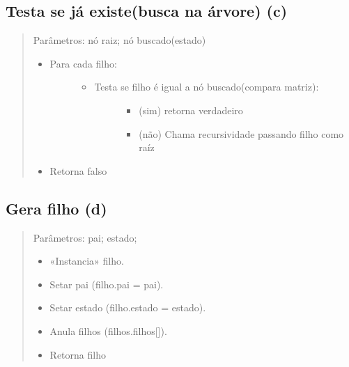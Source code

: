\documentclass[letterpaper,10pt,openany,oneside,portuges]{sphinxmanual}
\begin{document}
\subsection{Testa se já existe(busca na árvore) (c)}
\label{\detokenize{pseudo:testa-se-ja-existe-busca-na-arvore-c}}\begin{quote}

Parâmetros: nó raiz; nó buscado(estado)
\begin{itemize}
\item {} \begin{description}
\item[{Para cada filho:}] \leavevmode\begin{itemize}
\item {} \begin{description}
\item[{Testa se filho é igual a nó buscado(compara matriz):}] \leavevmode\begin{itemize}
\item {} 
(sim) retorna verdadeiro

\item {} 
(não) Chama recursividade passando filho como raíz

\end{itemize}

\end{description}

\end{itemize}

\end{description}

\item {} 
Retorna falso

\end{itemize}
\end{quote}


\subsection{Gera filho (d)}
\label{\detokenize{pseudo:gera-filho-d}}\begin{quote}

Parâmetros: pai; estado;
\begin{itemize}
\item {} 
«Instancia» filho.

\item {} 
Setar pai (filho.pai = pai).

\item {} 
Setar estado (filho.estado = estado).

\item {} 
Anula filhos (filhos.filhos{[}{]}).

\item {} 
Retorna filho

\end{itemize}
\end{quote}
\end{document}
